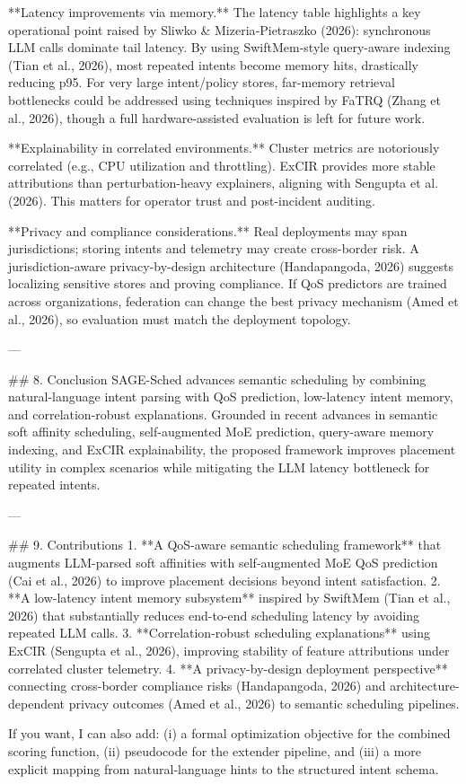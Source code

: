 **Latency improvements via memory.** The latency table highlights a key operational point raised by Sliwko & Mizeria‑Pietraszko (2026): synchronous LLM calls dominate tail latency. By using SwiftMem-style query-aware indexing (Tian et al., 2026), most repeated intents become memory hits, drastically reducing p95. For very large intent/policy stores, far-memory retrieval bottlenecks could be addressed using techniques inspired by FaTRQ (Zhang et al., 2026), though a full hardware-assisted evaluation is left for future work.

**Explainability in correlated environments.** Cluster metrics are notoriously correlated (e.g., CPU utilization and throttling). ExCIR provides more stable attributions than perturbation-heavy explainers, aligning with Sengupta et al. (2026). This matters for operator trust and post-incident auditing.

**Privacy and compliance considerations.** Real deployments may span jurisdictions; storing intents and telemetry may create cross-border risk. A jurisdiction-aware privacy-by-design architecture (Handapangoda, 2026) suggests localizing sensitive stores and proving compliance. If QoS predictors are trained across organizations, federation can change the best privacy mechanism (Amed et al., 2026), so evaluation must match the deployment topology.

---

## 8. Conclusion
SAGE-Sched advances semantic scheduling by combining natural-language intent parsing with QoS prediction, low-latency intent memory, and correlation-robust explanations. Grounded in recent advances in semantic soft affinity scheduling, self-augmented MoE prediction, query-aware memory indexing, and ExCIR explainability, the proposed framework improves placement utility in complex scenarios while mitigating the LLM latency bottleneck for repeated intents.

---

## 9. Contributions
1. **A QoS-aware semantic scheduling framework** that augments LLM-parsed soft affinities with self-augmented MoE QoS prediction (Cai et al., 2026) to improve placement decisions beyond intent satisfaction.
2. **A low-latency intent memory subsystem** inspired by SwiftMem (Tian et al., 2026) that substantially reduces end-to-end scheduling latency by avoiding repeated LLM calls.
3. **Correlation-robust scheduling explanations** using ExCIR (Sengupta et al., 2026), improving stability of feature attributions under correlated cluster telemetry.
4. **A privacy-by-design deployment perspective** connecting cross-border compliance risks (Handapangoda, 2026) and architecture-dependent privacy outcomes (Amed et al., 2026) to semantic scheduling pipelines.

If you want, I can also add: (i) a formal optimization objective for the combined scoring function, (ii) pseudocode for the extender pipeline, and (iii) a more explicit mapping from natural-language hints to the structured intent schema.